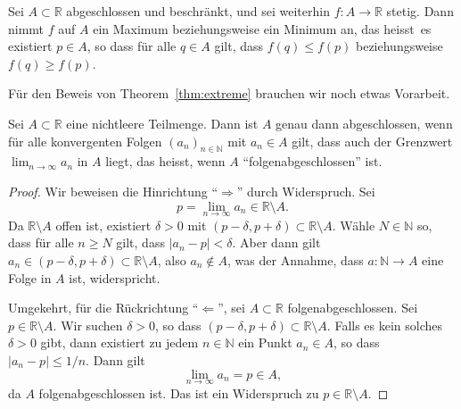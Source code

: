 \documentclass[../main.tex]{subfiles}
\begin{document}
\begin{theorem}\label{thm:extreme}
  Sei $A \subset \mathbb{R}$ abgeschlossen
  und beschränkt,
  und sei weiterhin $f \colon A \to \mathbb{R}$
  stetig. Dann nimmt $f$ auf $A$ ein
  Maximum beziehungsweise ein Minimum an,
  das heisst~es existiert $p \in A$,
  so dass für alle $q \in A$ gilt,
  dass $f(q) \leq f(p)$ beziehungsweise $f(q) \geq f(p)$.
\end{theorem}

Für den Beweis von Theorem~\ref{thm:extreme}
brauchen wir noch etwas Vorarbeit.

\begin{lemma*}[Folgenabgeschlossenheit]
  Sei $A \subset \mathbb{R}$ eine nichtleere Teilmenge.
  Dann ist $A$ genau dann abgeschlossen, wenn für
  alle konvergenten Folgen
  ${(a_{n})}_{n \in \mathbb{N}}$ mit
  $a_n \in A$ gilt, dass auch
  der Grenzwert $\lim_{n \to \infty} a_n$ in $A$ 
  liegt, das heisst, wenn $A$ ``folgenabgeschlossen'' ist.
\end{lemma*}

\begin{proof}
  Wir beweisen die Hinrichtung ``$\Rightarrow$'' durch Widerspruch.
  Sei
  \[
    p = \lim_{n \to \infty} a_n \in \mathbb{R} \setminus A.
  \]
  Da $\mathbb{R} \setminus A$ offen ist,
  existiert $\delta > 0$ mit $(p - \delta, p + \delta)
  \subset \mathbb{R} \setminus A$.
  Wähle $N \in \mathbb{N}$  so, dass für alle $n \geq N$
  gilt, dass $|a_n - p| < \delta$.
  Aber dann gilt $a_n \in (p - \delta, p + \delta)
  \subset \mathbb{R} \setminus A$,
  also $a_n \notin A$, was der Annahme, dass 
  $a \colon \mathbb{N} \to A$
  eine Folge in $A$ ist, widerspricht.

  Umgekehrt, für die Rückrichtung ``$\Leftarrow$'', sei
  $A \subset \mathbb{R}$ folgenabgeschlossen.
  Sei $p \in \mathbb{R} \setminus A$. Wir suchen
  $\delta > 0$, so dass $(p - \delta, p + \delta)
  \subset \mathbb{R} \setminus A$. Falls es kein
  solches $\delta > 0$ gibt, dann existiert zu jedem
  $n \in \mathbb{N}$ ein Punkt $a_n \in A$, so dass
  $|a_n - p| \leq 1/n$.
  Dann gilt
  \[
    \lim_{n \to \infty} a_n = p \in A,
  \]
  da $A$ folgenabgeschlossen ist. Das ist ein Widerspruch
  zu $p \in \mathbb{R} \setminus A$.
\end{proof}
\end{document}
